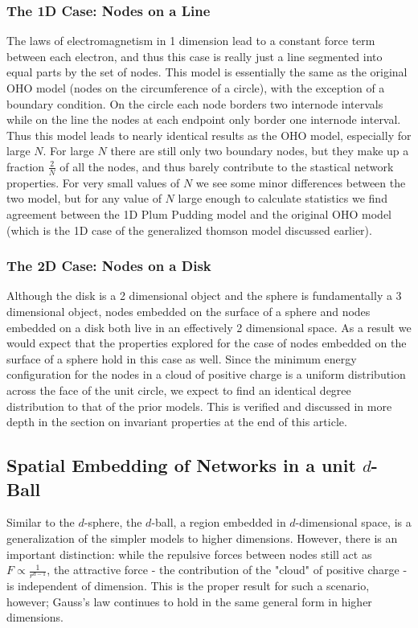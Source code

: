 \documentclass[aps,pre,reprint,superscriptaddress,amsmath,amssymb]{revtex4-1}
\begin{document}
\subsubsection{The 1D Case: Nodes on a Line}
The laws of electromagnetism in 1 dimension lead to a constant force term between each electron, and thus this case is really just a line segmented into equal parts by the set of nodes. 
This model is essentially the same as the original OHO model (nodes on the circumference of a circle), with the exception of a boundary condition. 
On the circle each node borders two internode intervals while on the line the nodes at each endpoint only border one internode interval.
Thus this model leads to nearly identical results as the OHO model, especially for large $N$.
For large $N$ there are still only two boundary nodes, but they make up a fraction $\frac{2}{N}$ of all the nodes, and thus barely contribute to the stastical network properties.
For very small values of $N$ we see some minor differences between the two model, but for any value of $N$ large enough to calculate statistics we find agreement between the 1D Plum Pudding model and the original OHO model (which is the 1D case of the generalized thomson model discussed earlier).



\subsubsection{The 2D Case: Nodes on a Disk}
Although the disk is a 2 dimensional object and the sphere is fundamentally a 3 dimensional object, nodes embedded on the surface of a sphere and nodes embedded on a disk both live in an effectively 2 dimensional space.
As a result we would expect that the properties explored for the case of nodes embedded on the surface of a sphere hold in this case as well.
Since the minimum energy configuration for the nodes in a cloud of positive charge is a uniform distribution across the face of the unit circle, we expect to find an identical degree distribution to that of the prior models.
This is verified and discussed in more depth in the section on invariant properties at the end of this article.

\subsection{Spatial Embedding of Networks in a unit $d$-Ball}
Similar to the $d$-sphere, the $d$-ball, a region embedded in $d$-dimensional space, is a generalization of the simpler models to higher dimensions.  
However, there is an important distinction: while the repulsive forces between nodes still act as $F \propto \frac{1}{r^{d-1}}$, the attractive force - the contribution of the "cloud" of positive charge - is independent of dimension.  
This is the proper result for such a scenario, however; Gauss's law continues to hold in the same general form in higher dimensions.
\end{document}
